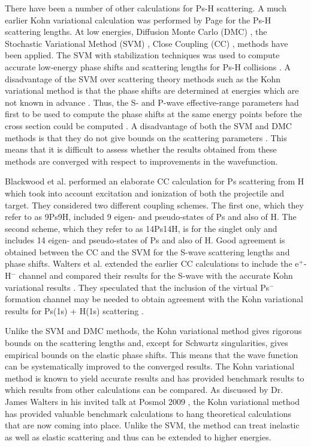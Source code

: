 \documentclass[preprint,showpacs,preprintnumbers,amsmath,amssymb]{revtex4}
\begin{document}
There have been a number of other calculations for
Ps-H scattering. A much earlier Kohn variational calculation was performed
by Page \cite{Page1976} for the Ps-H scattering lengths.
At low energies, Diffusion Monte Carlo (DMC) \cite{Chiesa2002},
the Stochastic Variational Method (SVM) \cite{Ivanov2002}, Close Coupling (CC) \cite{Blackwood2002,Walters2004}, 
 methods have been applied.
The SVM with stabilization techniques was used to compute
accurate low-energy phase shifts and scattering lengths for Ps-H collisions \cite{}.
A disadvantage of the SVM over scattering theory methods
such as the Kohn variational method is that the phase shifts
are determined at energies which are not known in advance \cite{}.
Thus, the S- and P-wave
effective-range parameters had first to be used to compute the phase shifts at the same energy
points before the cross section could be computed \cite{}. 
A disadvantage of both the SVM 
and DMC methods is that they do not give
bounds on the scattering parameters \cite{}.
This means that it is difficult to assess whether the results
obtained from these methods are converged with respect
to improvements in the wavefunction.

Blackwood et al. \cite{Blackwood2002} performed an elaborate CC calculation for Ps scattering from H which took into account excitation and ionization of both the projectile and target. They considered two different coupling schemes.
The first one, which they refer to as 9Ps9H, included 9 eigen- and pseudo-states of Ps and also of H. The second scheme, which they refer to as 14Ps14H, is for the singlet only and includes 14 eigen- and pseudo-states of Ps and also of H.
Good agreement is obtained between the CC \cite{Blackwood2002} and the SVM \cite{}
for the S-wave scattering lengths and phase shifts. Walters et al. \cite{Walters2004} extended the earlier CC calculations \cite{Blackwood2002} to include the e$^+$-H$^-$ channel and compared their results for the S-wave with the accurate
Kohn variational results \cite{VanReeth2003}.
They speculated that the inclusion of the virtual Ps$^-$ formation channel may
be needed to obtain agreement with the Kohn variational results
for Ps(1s) + H(1s) scattering \cite{Blackwood2002}.

Unlike the SVM and 
DMC methods, the Kohn
variational method gives rigorous bounds on the scattering
lengths and, except for Schwartz singularities, gives empirical bounds on
the elastic phase shifts.
This means that the wave function can be systematically
improved to the converged results.
The Kohn variational method is known to yield accurate results and 
has provided benchmark results \cite{} to which results from
other calculations can be compared.
As discussed by Dr. James Walters in his invited talk
at Posmol 2009 \cite{Walters2009},
the Kohn variational method has provided
valuable benchmark calculations to hang theoretical
calculations that are now coming into place.
Unlike the SVM, the method can 
treat inelastic as well as elastic scattering
and thus can be extended to higher energies. 
\end{document}
